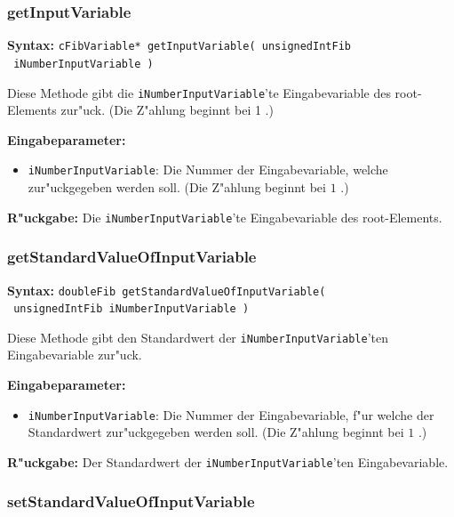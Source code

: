 \subsubsection{getInputVariable}

\textbf{Syntax:} \verb|cFibVariable* getInputVariable( unsignedIntFib| \\\verb| iNumberInputVariable )|

\bigskip\noindent
Diese Methode gibt die \verb|iNumberInputVariable|'te Eingabevariable des root-Elements zur"uck. (Die Z"ahlung beginnt bei 1 .)

\bigskip\noindent
\textbf{Eingabeparameter:}
\begin{itemize}
 \item \verb|iNumberInputVariable|: Die Nummer der Eingabevariable, welche zur"uckgegeben werden soll. (Die Z"ahlung beginnt bei $1$ .)
\end{itemize}

\bigskip\noindent
\textbf{R"uckgabe:} Die \verb|iNumberInputVariable|'te Eingabevariable des root-Elements.


\subsubsection{getStandardValueOfInputVariable}

\textbf{Syntax:} \verb|doubleFib getStandardValueOfInputVariable(| \\\verb| unsignedIntFib iNumberInputVariable )|

\bigskip\noindent
Diese Methode gibt den Standardwert der \verb|iNumberInputVariable|'ten Eingabevariable zur"uck.

\bigskip\noindent
\textbf{Eingabeparameter:}
\begin{itemize}
 \item \verb|iNumberInputVariable|: Die Nummer der Eingabevariable, f"ur welche der Standardwert zur"uckgegeben werden soll. (Die Z"ahlung beginnt bei $1$ .)
\end{itemize}

\bigskip\noindent
\textbf{R"uckgabe:} Der Standardwert der \verb|iNumberInputVariable|'ten Eingabevariable.


\subsubsection{setStandardValueOfInputVariable}

